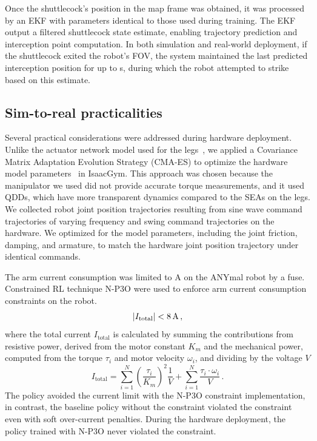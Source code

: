 \documentclass[9pt,twocolumn,twoside]{osajnl}
\begin{document}
Once the shuttlecock's position in the map frame was obtained, it was processed by an \ac{EKF} with parameters identical to those used during training. The \ac{EKF} output a filtered shuttlecock state estimate, enabling trajectory prediction and interception point computation. In both simulation and real-world deployment, if the shuttlecock exited the robot's \ac{FOV}, the system maintained the last predicted interception position for up to \unit[2]{s}, during which the robot attempted to strike based on this estimate.

\subsection*{Sim-to-real practicalities}
Several practical considerations were addressed during hardware deployment. Unlike the actuator network model used for the legs~\cite{hwangbo2019learning}, we applied a Covariance Matrix Adaptation Evolution Strategy (CMA-ES) to optimize the hardware model parameters~\cite{filip2024} in IsaacGym. This approach was chosen because the manipulator we used did not provide accurate torque measurements, and it used \acp{QDD}, which have more transparent dynamics compared to the \acp{SEA} on the legs. We collected robot joint position trajectories resulting from sine wave command trajectories of varying frequency and swing command trajectories on the hardware. We optimized for the model parameters, including the joint friction, damping, and armature, to match the hardware joint position trajectory under identical commands.

The arm current consumption was limited to \unit[8]{A} on the ANYmal robot by a fuse. Constrained \ac{RL} technique N-P3O \cite{lee2023evaluation} were used to enforce arm current consumption constraints on the robot.
\begin{equation}
    |I_{\text{total}}| < \unit[8]{A}\,,
\end{equation}
where the total current $I_{\text{total}}$ is calculated by summing the contributions from resistive power, derived from the motor constant $K_m$ and the mechanical power, computed from the torque $\tau_{i}$ and motor velocity $\omega_{i}$, and dividing by the voltage $V$
\begin{equation}
    I_{\text{total}} = \sum_{i=1}^{N} \left( \frac{\tau_{i}}{K_{m}} \right)^2 \frac{1}{V} + \sum_{i=1}^{N} \frac{\tau_{i} \cdot \omega_{i}}{V}\,.
\end{equation}
The policy avoided the current limit with the N-P3O constraint implementation, in contrast, the baseline policy without the constraint violated the constraint even with soft over-current penalties. During the hardware deployment, the policy trained with N-P3O never violated the constraint.
\end{document}
